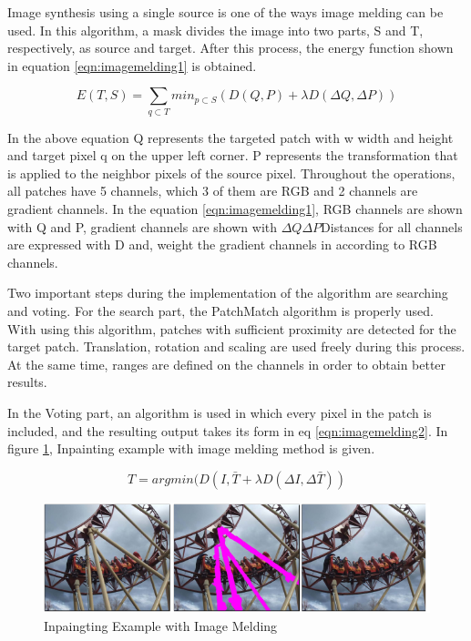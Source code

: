 Image synthesis using a single source is one of the ways image melding can be used. In this algorithm, a mask divides the image into two parts, S and T, respectively, as source and target. After this process, the energy function shown in equation \ref{eqn:imagemelding1} is obtained.

\begin{equation}
    \label{eqn:imagemelding1}
    E(T,S) = \sum\limits_{q\subset T}{min_{p\subset S}(D(Q,P)+\lambda D(\Delta Q, \Delta P))}
\end{equation}

In the above equation Q represents the targeted patch with w width and height and target pixel q on the upper left corner. P represents the transformation that is applied to the neighbor pixels of the source pixel. Throughout the operations, all patches have 5 channels, which 3 of them are RGB and 2 channels are gradient channels. In the equation \ref{eqn:imagemelding1}, RGB channels are shown with Q and P, gradient channels are shown with \(\Delta Q \Delta P \)Distances for all channels are expressed with D and,  weight the gradient channels in according to RGB channels.

Two important steps during the implementation of the algorithm are searching and voting. For the search part, the PatchMatch algorithm is properly used. With using this algorithm, patches with sufficient proximity are detected for the target patch. Translation, rotation and scaling are used freely during this process. At the same time, ranges are defined on the channels in order to obtain better results.

In the Voting part, an algorithm is used in which every pixel in the patch is included, and the resulting output takes its form in eq \ref{eqn:imagemelding2}. In figure \ref{fig:inpainting-image-melding}, Inpainting example with image melding method is given.

\begin{equation}
    \label{eqn:imagemelding2}
    T= argmin(D(I,\bar{T}+\lambda D(\Delta I,\Delta \bar{T}))
\end{equation}

\begin{figure}[h]
    \centering
    \includegraphics{figures/chapter2/ImageMeldingExample.png}
    \vspace*{5mm}
    \caption{Inpaingting Example with Image Melding\cite{imagemelding}}
    \label{fig:inpainting-image-melding}
\end{figure}

